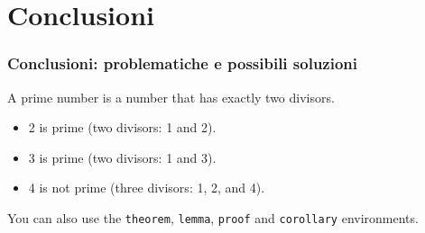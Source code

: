 \documentclass[
	11pt, %
]{beamer}
\begin{document}

\section{Conclusioni}

\begin{frame}
	\frametitle{Conclusioni: problematiche e possibili soluzioni}
	
	\begin{definition}
		A \alert{prime number} is a number that has exactly two divisors.
	\end{definition}
	
	\smallskip %
	
	\begin{example}
		\begin{itemize}
			\item 2 is prime (two divisors: 1 and 2).
			\item 3 is prime (two divisors: 1 and 3).
			\item 4 is not prime (\alert{three} divisors: 1, 2, and 4).
		\end{itemize}
	\end{example}
	
	\smallskip %
	
	You can also use the \texttt{theorem}, \texttt{lemma}, \texttt{proof} and \texttt{corollary} environments.
\end{frame}









\end{document}

